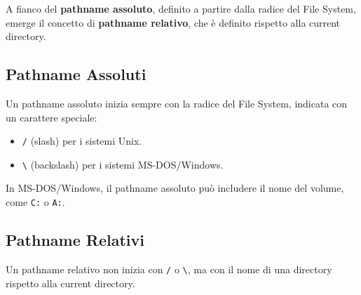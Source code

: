 
A fianco del \textbf{pathname assoluto}, definito a partire dalla radice del File System, emerge il concetto di \textbf{pathname relativo}, che è definito rispetto alla current directory.

\subsection{Pathname Assoluti}
Un pathname assoluto inizia sempre con la radice del File System, indicata con un carattere speciale:
\begin{itemize}
    \item \texttt{/} (slash) per i sistemi Unix.
    \item \texttt{\textbackslash} (backslash) per i sistemi MS-DOS/Windows.
\end{itemize}

In MS-DOS/Windows, il pathname assoluto può includere il nome del volume, come \texttt{C:} o \texttt{A:}.


\subsection{Pathname Relativi}
Un pathname relativo non inizia con \texttt{/} o \texttt{\textbackslash}, ma con il nome di una directory rispetto alla current directory. 



